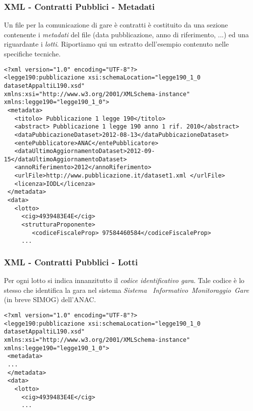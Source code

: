 \documentclass[8pt]{beamer}
\begin{document}
\begin{frame}[fragile]
 \frametitle{XML - Contratti Pubblici - Metadati}
 Un file per la comunicazione di gare \`e contratti \`e costituito 
 da una sezione contenente i \emph{metadati} del file (data pubblicazione,
 anno di riferimento, ...) ed una riguardante i \emph{lotti}.
 Riportiamo qui un estratto dell'esempio contenuto nelle
 specifiche tecniche. 
\begin{small}
\begin{verbatim}
<?xml version="1.0" encoding="UTF-8"?> 
<legge190:pubblicazione xsi:schemaLocation="legge190_1_0 datasetAppaltiL190.xsd" 
xmlns:xsi="http://www.w3.org/2001/XMLSchema-instance" xmlns:legge190="legge190_1_0"> 
 <metadata> 
   <titolo> Pubblicazione 1 legge 190</titolo> 
   <abstract> Pubblicazione 1 legge 190 anno 1 rif. 2010</abstract> 
   <dataPubbicazioneDataset>2012-08-13</dataPubbicazioneDataset> 
   <entePubblicatore>ANAC</entePubblicatore> 
   <dataUltimoAggiornamentoDataset>2012-09-15</dataUltimoAggiornamentoDataset> 
   <annoRiferimento>2012</annoRiferimento> 
   <urlFile>http://www.pubblicazione.it/dataset1.xml </urlFile> 
   <licenza>IODL</licenza> 
 </metadata> 
 <data> 
   <lotto> 
     <cig>4939483E4E</cig> 
     <strutturaProponente> 
        <codiceFiscaleProp> 97584460584</codiceFiscaleProp>  
     ...
\end{verbatim}
\end{small}
\end{frame}

\begin{frame}[fragile]
 \frametitle{XML - Contratti Pubblici - Lotti}
 Per ogni lotto si indica innanzitutto il \emph{codice identificativo gara}.
 Tale codice \`e lo stesso che identifica la gara nel sistema \emph{Sistema 
 Informativo Monitoraggio Gare} (in breve SIMOG) dell'ANAC.
 
 \begin{small}
\begin{verbatim}
<?xml version="1.0" encoding="UTF-8"?> 
<legge190:pubblicazione xsi:schemaLocation="legge190_1_0 datasetAppaltiL190.xsd" 
xmlns:xsi="http://www.w3.org/2001/XMLSchema-instance" xmlns:legge190="legge190_1_0"> 
 <metadata> 
 ...
 </metadata>
 <data>
   <lotto>
     <cig>4939483E4E</cig>
     ...
\end{verbatim}
\end{small}

\end{frame}
\end{document}
